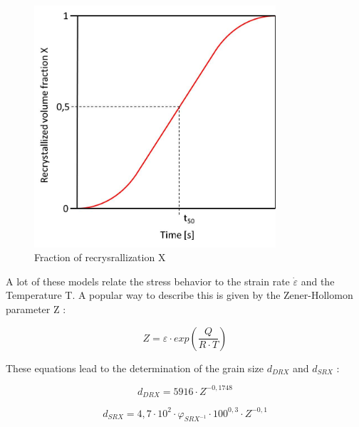\begin{figure}[htbp]
 \centering
 \includegraphics[width=0.8\textwidth]{images/JMAK}
 \caption{Fraction of recrysrallization X}
 \label{img:JMAK}
\end{figure}

A lot of these models relate the stress behavior to the strain rate $\dot{\varepsilon}$ and the Temperature T. A popular way to describe this is given by the Zener-Hollomon parameter Z \cite{ZEN44}:

\begin{equation}
 Z =  \varepsilon\cdot exp\left( \frac{Q}{R\cdot T}\right)
\end{equation}

These equations lead to the determination of the grain size $d_{DRX}$ and $d_{SRX}$ \cite{DEH08}:

\begin{equation}
 d_{DRX} =  5916\cdot Z^{-0,1748}
\end{equation}

\begin{equation}
 d_{SRX} =  4,7\cdot10^{2}\cdot\varphi_{SRX^{-1}}\cdot100^{0,3}\cdot Z^{-0,1}
\end{equation}
